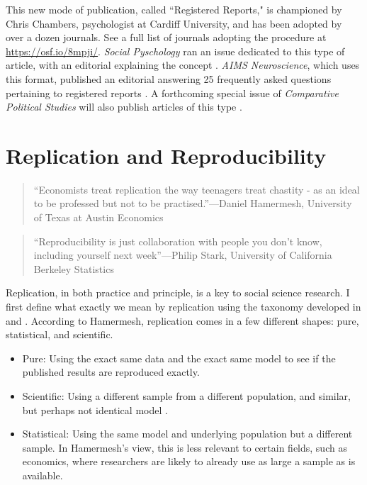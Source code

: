 \documentclass[12pt] {article}
\begin{document}
This new mode of publication, called ``Registered Reports," is championed by Chris Chambers, psychologist at Cardiff University, and has been adopted by over a dozen journals. See a full list of journals adopting the procedure at \url{https://osf.io/8mpji/}. \textit{Social Pyschology} ran an issue dedicated to this type of article, with an editorial explaining the concept \citep{nosek2014registered}. \textit{AIMS Neuroscience}, which uses this format, published an editorial answering 25 frequently asked questions pertaining to registered reports \citep{chambers2014instead}. A forthcoming special issue of \textit{Comparative Political Studies} will also publish articles of this type \citep{FindleyCPS}. 

  


\section{Replication and
Reproducibility}\label{replication-and-reproducibility}

\begin{quote}
``Economists treat replication the way teenagers treat chastity - as an
ideal to be professed but not to be practised.''---Daniel Hamermesh,
University of Texas at Austin Economics
\end{quote}

\begin{quote}
``Reproducibility is just collaboration with people you don't know,
including yourself next week''---Philip Stark, University of California Berkeley Statistics
\end{quote}

Replication, in both practice and principle, is a key to social
science research. I first define what exactly we mean by replication
using the taxonomy developed in \cite{hamermesh_viewpoint:_2007} and \cite{hunter_desperate_2001}.
According to Hamermesh, replication comes in a few different shapes: pure, statistical, and
scientific.

\begin{itemize}
\item
  Pure: Using the exact same data and the exact same model to see if the
  published results are reproduced exactly.
\item
  Scientific: Using a different sample from a different population, and
  similar, but perhaps not identical model .
\item
  Statistical: Using the same model and underlying population but a
  different sample. In Hamermesh's view, this is less relevant to certain fields, such as economics,
  where researchers are likely to already use as large a sample as is available.
\end{itemize}
\end{document}
